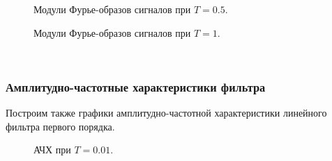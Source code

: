 \documentclass[a5paper, 10pt]{article}
\theoremstyle{definition}
\theoremstyle{plain}
\theoremstyle{remark}
\begin{document}
\begin{figure}[h!]
\caption{Модули Фурье-образов сигналов при $T = 0.5$.}
\caption{Модули Фурье-образов сигналов при $T = 1$.}
\end{figure}
\, \\
\subsubsection{Амплитудно-частотные характеристики фильтра}
Построим также графики амплитудно-частотной характеристики линейного фильтра первого порядка.
\begin{figure}[h!]
\caption{АЧХ при $T = 0.01$.}
\end{figure}
\end{document}

